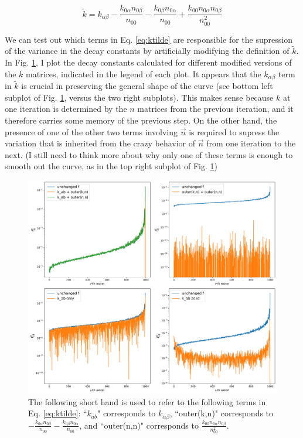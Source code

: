 \documentclass[11pt]{article}
\begin{document}
\begin{equation}
    \label{eq:ktilde}
    \tilde{k} = k_{\alpha\beta} - \frac{k_{0\alpha}n_{0\beta}}{n_{00}} - \frac{k_{0\beta}n_{0\alpha}}{n_{00}} + \frac{k_{00} n_{0\alpha}n_{0\beta}}{n_{00}^2}
\end{equation}

We can test out which terms in Eq. \eqref{eq:ktilde} are responsible for the supression of the variance in the decay constants by artificially modifying the definition of $\tilde{k}$. In Fig. \ref{fig:fs-modifying-k}, I plot the decay constants calculated for different modified versions of the $k$ matrices, indicated in the legend of each plot. It appears that the $k_{\alpha\beta}$ term in $\tilde{k}$ is crucial in preserving the general shape of the curve (see bottom left subplot of Fig. \ref{fig:fs-modifying-k}, versus the two right subplots). This makes sense because $k$ at one iteration is determined by the $n$ matrices from the previous iteration, and it therefore carries some memory of the previous step. On the other hand, the presence of one of the other two terms involving $\vec{n}$ is required to supress the variation that is inherited from the crazy behavior of $\vec{n}$ from one iteration to the next. (I still need to think more about why only one of these terms is enough to smooth out the curve, as in the top right subplot of Fig. \ref{fig:fs-modifying-k})

\begin{figure}[h]
    \centering
    \includegraphics[width=0.95\linewidth]{figs/f_comparisons.png}
    \caption{The following short hand is used to refer to the following terms in Eq. \eqref{eq:ktilde}: ``$k_{ab}$" corresponds to $k_{\alpha\beta}$, ``outer(k,n)" corresponds to $- \frac{k_{0\alpha}n_{0\beta}}{n_{00}} - \frac{k_{0\beta}n_{0\alpha}}{n_{00}} $, and ``outer(n,n)" corresponds to $\frac{k_{00} n_{0\alpha}n_{0\beta}}{n_{00}^2}$.}
    \label{fig:fs-modifying-k}
\end{figure}
\end{document}
